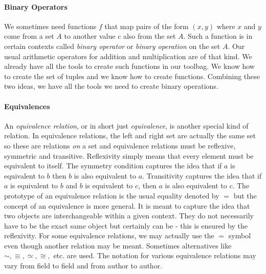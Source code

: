 
\paragraph{Binary Operators} We sometimes need functions $f$ that map pairs of the form $(x,y)$ where $x$ and $y$ come from a set $A$ to another value $c$ also from the set $A$. Such a function is in certain contexts called \emph{binary operator} or \emph{binary operation} on the set $A$. Our usual arithmetic operators for addition and multiplication are of that kind. We already have all the tools to create such functions in our toolbag. We know how to create the set of tuples and we know how to create functions. Combining these two ideas, we have all the tools we need to create binary operations.


\paragraph{Equivalences} An \emph{equivalence relation}, or in short just \emph{equivalence}, is another special kind of relation. In equivalence relations, the left and right set are actually the same set so these are relations \emph{on} a set and equivalence relations must be reflexive, symmetric and transitive. Reflexivity simply means that every element must be equivalent to itself. The symmetry condition captures the idea that if $a$ is equivalent to $b$ then $b$ is also equivalent to $a$. Transitivity captures the idea that if $a$ is equivalent to $b$ and $b$ is equivalent to $c$, then $a$ is also equivalent to $c$. The prototype of an equivalence relation is the usual equality denoted by $=$ but the concept of an equivalence is more general. It is meant to capture the idea that two objects are interchangeable within a given context. They do not necessarily have to be the exact same object but certainly can be - this is ensured by the reflexivity. For some equivalence relations, we may actually use the $=$ symbol even though another relation may be meant. Sometimes alternatives like $\sim, \equiv, \simeq, \cong,$ etc. are used. The notation for various equivalence relations may vary from field to field and from author to author. 

